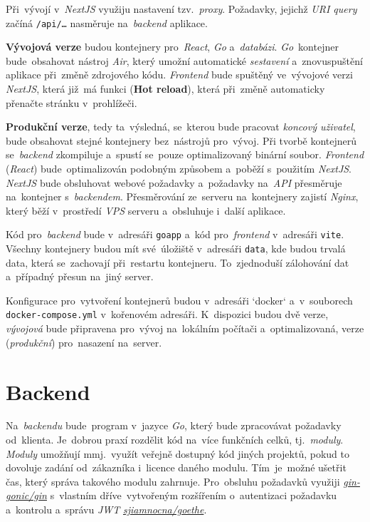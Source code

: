 \documentclass[11pt,a4paper]{report}
\begin{document}
        Při~vývojí v~\emph{NextJS} využiju nastavení tzv.~\emph{proxy}. Požadavky, jejichž \emph{URI query} začíná \texttt{/api/\dots} nasměruje na~\emph{backend} aplikace.
        
        \textbf{Vývojová verze} budou kontejnery pro~\emph{React}, \emph{Go} a~\emph{databázi}. \emph{Go}~kontejner bude~obsahovat nástroj \emph{Air}, který umožní automatické \emph{sestavení} a~znovuspuštění aplikace při~změně zdrojového kódu. \emph{Frontend} bude spuštěný ve~vývojové verzi \emph{NextJS}, která již~má funkci (\textbf{Hot reload}), která při~změně automaticky přenačte stránku v~prohlížeči.

        \textbf{Produkční verze}, tedy ta~výsledná, se~kterou bude pracovat \emph{koncový uživatel}, bude obsahovat stejné kontejnery bez~nástrojů pro~vývoj. Při tvorbě kontejnerů se~\emph{backend} zkompiluje a~spustí se~pouze optimalizovaný binární soubor. \emph{Frontend} (\emph{React}) bude~optimalizován podobným způsobem a~poběží s~použitím \emph{NextJS}. \emph{NextJS} bude obsluhovat webové požadavky a~požadavky na~\emph{API} přesměruje na~kontejner s~\emph{backendem}. Přesměrování ze~serveru na~kontejnery zajistí \emph{Nginx}, který běží v~prostředí \emph{VPS} serveru a~obsluhuje i~další aplikace.

        Kód pro~\emph{backend} bude v~adresáři \texttt{goapp} a~kód pro~\emph{frontend} v~adresáři \texttt{vite}. Všechny kontejnery budou mít své~úložiště v~adresáři \texttt{data}, kde budou trvalá data, která se~zachovají při~restartu kontejneru. To~zjednoduší zálohování dat a~případný přesun na~jiný server.

        Konfigurace pro~vytvoření kontejnerů budou v~adresáři `docker` a~v~souborech \texttt{docker-compose.yml} v~kořenovém adresáři. K~dispozici budou dvě verze, \emph{vývojová} bude připravena pro~vývoj na~lokálním počítači a~optimalizovaná, verze (\emph{produkční}) pro~nasazení na~server.
        
        \section{Backend}
            Na~\emph{backendu} bude~program v~jazyce \emph{Go}, který bude zpracovávat požadavky od~klienta. Je~dobrou praxí rozdělit kód na~více funkčních celků, tj.~\emph{moduly}. \emph{Moduly} umožňují mmj.~využít veřejně dostupný kód jiných projektů, pokud to dovoluje zadání od~zákazníka i~licence daného modulu. Tím~je~možné ušetřit čas, který správa takového modulu zahrnuje. \cite{Zimmerman2023:howtowritebetter}
            Pro~obsluhu požadavků využiji \href{https://github.com/gin-gonic/gin}{\emph{gin-gonic/gin}} s~vlastním dříve~vytvořeným rozšířením o~autentizaci požadavku a~kontrolu a~správu \emph{JWT} \href{https://gitlab.com/sjiamnocna/goethe}{\emph{sjiamnocna/goethe}}.
\end{document}
